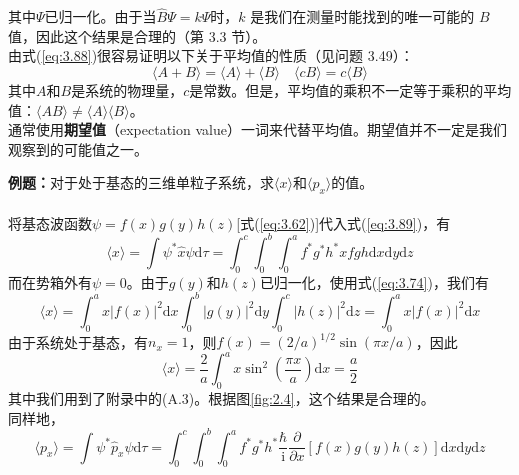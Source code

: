 	其中$\Psi$已归一化。由于当$\hat{B}\Psi = k\Psi$时，$k$ 是我们在测量时能找到的唯一可能的 $B$ 值，因此这个结果是合理的（第 3.3 节）。\\
	\indent 由式(\ref{eq:3.88})很容易证明以下关于平均值的性质（见问题 3.49）：
	\begin{equation}
		\boxed{
			\langle A + B \rangle = \langle A \rangle + \langle B \rangle
		}
		\quad
		\boxed{
			\langle cB \rangle = c\langle B \rangle
		}
		\label{eq:3.90}
	\end{equation}
	其中$A$和$B$是系统的物理量，$c$是常数。但是，平均值的乘积不一定等于乘积的平均值：$\langle AB \rangle \neq \langle A \rangle\langle B \rangle$。\\
	\indent 通常使用\textbf{期望值}（expectation value）一词来代替平均值。期望值并不一定是我们观察到的可能值之一。
	\begin{examplebox}
		\textbf{例题：}对于处于基态的三维单粒子系统，求$\langle x \rangle$和$\langle p_x \rangle$的值。\\
		\\
		将基态波函数$\psi=f\left(x\right)g\left(y\right)h\left(z\right)$[式(\ref{eq:3.62})]代入式(\ref{eq:3.89})，有
		\begin{equation*}
			\langle x \rangle = \int \psi^{\ast}\hat{x}\psi \mathrm{d}\tau = \int_{0}^{c}\int_{0}^{b}\int_{0}^{a}f^{\ast}g^{\ast}h^{\ast} x fgh\mathrm{d}x\mathrm{d}y\mathrm{d}z
		\end{equation*}
		而在势箱外有$\psi = 0$。由于$g\left(y\right)$和$h\left(z\right)$已归一化，使用式(\ref{eq:3.74})，我们有
		\begin{equation*}
			\langle x \rangle = \int_{0}^{a} x\left|f\left(x\right)\right|^{2}\mathrm{d}x \int_{0}^{b}\left|g\left(y\right)\right|^{2}\mathrm{d}y \int_{0}^{c}\left|h\left(z\right)\right|^{2}\mathrm{d}z = \int_{0}^{a} x\left|f\left(x\right)\right|^{2}\mathrm{d}x
		\end{equation*}
		由于系统处于基态，有$n_x=1$，则$f\left(x\right) = \left(2/a\right)^{1/2}\sin\left(\pi x/a\right)$，因此
		\begin{equation}
			\langle x \rangle = \frac{2}{a}\int_{0}^{a} x\sin^{2}\left(\frac{\pi x}{a}\right)\mathrm{d}x = \frac{a}{2}
			\label{eq:3.91}
		\end{equation}
		其中我们用到了附录中的(A.3)。根据图\ref{fig:2.4}，这个结果是合理的。\\
		\indent 同样地，
		\begin{equation*}
			\langle p_x \rangle = \int \psi^{\ast}\hat{p}_x\psi \mathrm{d}\tau = \int_{0}^{c}\int_{0}^{b}\int_{0}^{a}f^{\ast}g^{\ast}h^{\ast} \frac{\hbar}{\mathrm{i}}\frac{\partial}{\partial x}\left[f\left(x\right)g\left(y\right)h\left(z\right)\right]\mathrm{d}x\mathrm{d}y\mathrm{d}z

\end{equation*}
\end{examplebox}
